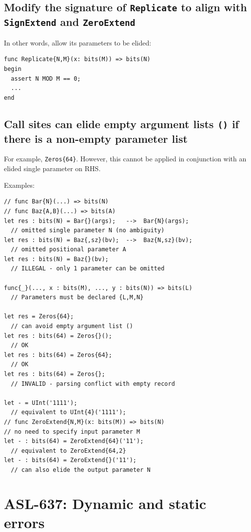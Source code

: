 \subsection{Modify the signature of \texttt{Replicate} to align with \texttt{SignExtend} and \texttt{ZeroExtend}} 

In other words, allow its parameters to be elided:

\begin{verbatim}
func Replicate{N,M}(x: bits(M)) => bits(N)
begin
  assert N MOD M == 0;
  ...
end
\end{verbatim}

\subsection{Call sites can elide empty argument lists \texttt{()} if
there is a non-empty parameter list} 
For example, \texttt{Zeros\{64\}}. However, this cannot
be applied in conjunction with an elided single parameter on RHS.

Examples:
\begin{verbatim}
// func Bar{N}(...) => bits(N)
// func Baz{A,B}(...) => bits(A)
let res : bits(N) = Bar{}(args);   -->  Bar{N}(args);    
  // omitted single parameter N (no ambiguity)
let res : bits(N) = Baz{,sz}(bv);  -->  Baz{N,sz}(bv);   
  // omitted positional parameter A
let res : bits(N) = Baz{}(bv);                           
  // ILLEGAL - only 1 parameter can be omitted

func{_}(..., x : bits(M), ..., y : bits(N)) => bits(L)   
  // Parameters must be declared {L,M,N}

let res = Zeros{64};                
  // can avoid empty argument list ()
let res : bits(64) = Zeros{}();     
  // OK
let res : bits(64) = Zeros{64};     
  // OK
let res : bits(64) = Zeros{};       
  // INVALID - parsing conflict with empty record

let - = UInt('1111'); 
  // equivalent to UInt{4}('1111');
// func ZeroExtend{N,M}(x: bits(M)) => bits(N)
// no need to specify input parameter M
let - : bits(64) = ZeroExtend{64}('11'); 
  // equivalent to ZeroExtend{64,2}
let - : bits(64) = ZeroExtend{}('11');   
  // can also elide the output parameter N 
\end{verbatim}

\section{ASL-637: Dynamic and static errors}

